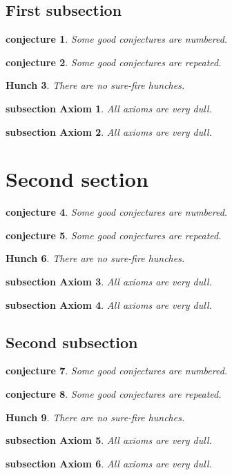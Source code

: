 ﻿\documentclass{article}
\newtheorem{guess}{conjecture}
\newtheorem{axiom}{subsection Axiom}[subsection]
\newtheorem{hunch}[guess]{Hunch}
\begin{document}
\subsection{First subsection}
\begin{guess}Some good conjectures are numbered.\end{guess}
\begin{guess}Some good conjectures are repeated.\end{guess}
\begin{hunch} There are no sure-fire hunches. \end{hunch}
\begin{axiom} All axioms are very dull. \end{axiom}
\begin{axiom} All axioms are very dull. \end{axiom}

\section{Second section}
\begin{guess}Some good conjectures are numbered.\end{guess}
\begin{guess}Some good conjectures are repeated.\end{guess}
\begin{hunch} There are no sure-fire hunches. \end{hunch}
\begin{axiom} All axioms are very dull. \end{axiom}
\begin{axiom} All axioms are very dull. \end{axiom}

\subsection{Second subsection}
\begin{guess}Some good conjectures are numbered.\end{guess}
\begin{guess}Some good conjectures are repeated.\end{guess}
\begin{hunch} There are no sure-fire hunches. \end{hunch}
\begin{axiom} All axioms are very dull. \end{axiom}
\begin{axiom} All axioms are very dull. \end{axiom}
\end{document}
